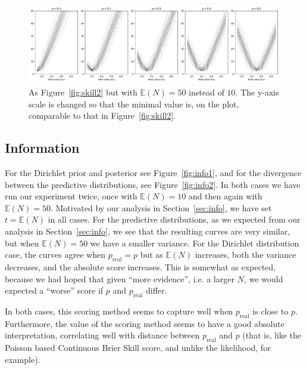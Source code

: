 \documentclass[twoside,a4paper,twocolumn,10pt]{article}
\theoremstyle{plain}
\theoremstyle{definition}
\begin{document}
\begin{figure}
  \includegraphics[width=\textwidth]{../details/brier_poisson1_toy.pdf}
  \caption{As Figure~\ref{fig:skill2} but with $\mathbb E(N)=50$ instead of $10$.
  The y-axis scale is changed so that the minimal value is, on the plot, comparable
  to that in Figure~\ref{fig:skill2}.}
  \label{fig:skill3}
\end{figure}



\subsection{Information}

For the Dirichlet prior and posterior see Figure~\ref{fig:info1}, and for the divergence
between the predictive distributions, see Figure~\ref{fig:info2}.  In both cases we have
run our experiment twice, once with $\mathbb E(N)=10$ and then again with $\mathbb E(N)=50$.
Motivated by our analysis in Section~\ref{sec:info}, we have set $t=\mathbb E(N)$ in all cases.
For the predictive distributions, as we expected from our analysis in Section~\ref{sec:info},
we see that the resulting curves are very similar, but when $\mathbb E(N)=50$ we have a
smaller variance.  For the Dirichlet distribution case, the curves agree when
$p_{\text{real}} = p$ but as $\mathbb E(N)$ increases, both the variance decreases, and the
absolute score increases.  This is somewhat as expected, because we had hoped that given
``more evidence'', i.e. a larger $N$, we would expected a ``worse'' score if $p$ and
$p_{\text{real}}$ differ.

In both cases, this scoring method seems to capture well when $p_{\text{real}}$ is close
to $p$.  Furthermore, the value of the scoring method seems to have a good absolute
interpretation, correlating well with distance between $p_{\text{real}}$ and $p$ (that
is, like the Poisson based Continuous Brier Skill score, and unlike the likelihood, for
example).
\end{document}
